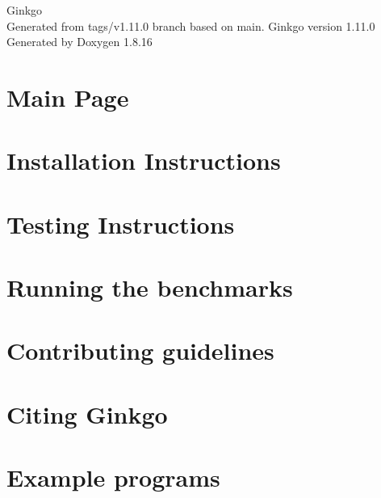 \let\mypdfximage\pdfximage\def\pdfximage{\immediate\mypdfximage}\documentclass[twoside]{book}
\newcommand{\+}{\discretionary{\mbox{\scriptsize$\hookleftarrow$}}{}{}}
\newcommand{\clearemptydoublepage}{%
  \newpage{\pagestyle{empty}\cleardoublepage}%
}
\begin{document}
\hypersetup{pageanchor=false,
             bookmarksnumbered=true,
             pdfencoding=unicode
            }
\begin{titlepage}
\vspace*{7cm}
\begin{center}%
{\Large Ginkgo \\[1ex]\large Generated from tags/v1.\+11.\+0 branch based on main. Ginkgo version 1.\+11.\+0 }\\
\vspace*{1cm}
{\large Generated by Doxygen 1.8.16}\\
\end{center}
\end{titlepage}
\clearemptydoublepage
{}
\tableofcontents
\clearemptydoublepage
{}
\hypersetup{pageanchor=true}

\chapter{Main Page}
\label{index}\hypertarget{index}{}
\chapter{Installation Instructions}
\label{install_ginkgo}

\chapter{Testing Instructions}
\label{testing_ginkgo}

\chapter{Running the benchmarks}
\label{benchmarking_ginkgo}

\chapter{Contributing guidelines}
\label{contributing_guidelines}

\chapter{Citing Ginkgo}
\label{citing_ginkgo}

\chapter{Example programs}
\label{Examples}

\end{document}
